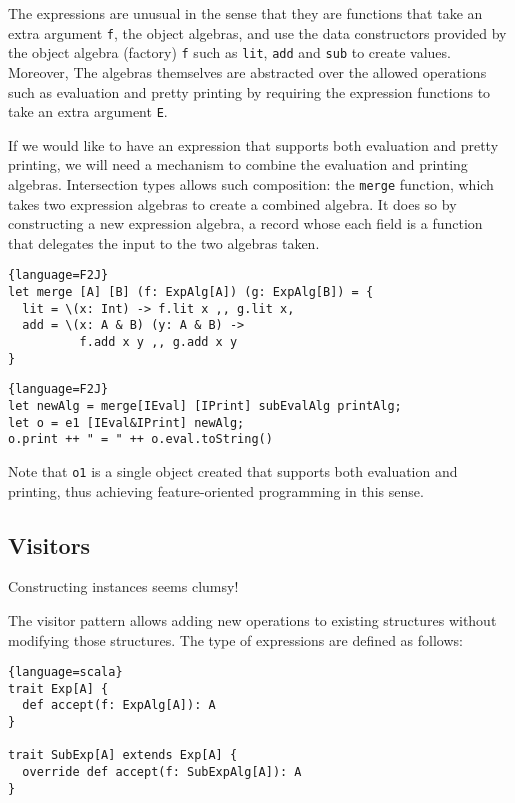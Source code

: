 The expressions are unusual in the sense that they are functions that take an
extra argument \lstinline$f$, the object algebras, and use the data constructors
provided by the object algebra (factory) \lstinline$f$ such as \lstinline$lit$,
\lstinline$add$ and \lstinline$sub$ to create values. Moreover, The algebras
themselves are abstracted over the allowed operations such as evaluation and
pretty printing by requiring the expression functions to take an extra argument
\lstinline$E$.

If we would like to have an expression that supports both evaluation and pretty
printing, we will need a mechanism to combine the evaluation and printing
algebras. Intersection types allows such composition: the \lstinline$merge$
function, which takes two expression algebras to create a combined algebra. It
does so by constructing a new expression algebra, a record whose each field is a
function that delegates the input to the two algebras taken.
\begin{lstlisting}{language=F2J}
let merge [A] [B] (f: ExpAlg[A]) (g: ExpAlg[B]) = {
  lit = \(x: Int) -> f.lit x ,, g.lit x,
  add = \(x: A & B) (y: A & B) ->
          f.add x y ,, g.add x y
}
\end{lstlisting}

\begin{lstlisting}{language=F2J}
let newAlg = merge[IEval] [IPrint] subEvalAlg printAlg;
let o = e1 [IEval&IPrint] newAlg;
o.print ++ " = " ++ o.eval.toString()
\end{lstlisting}
Note that \lstinline$o1$ is a single object created that supports both
evaluation and printing, thus achieving feature-oriented programming in this
sense.

\subsection{Visitors}

Constructing instances seems clumsy!

The visitor pattern allows adding new operations to existing structures without
modifying those structures. The type of expressions are defined as follows:

\begin{lstlisting}{language=scala}
trait Exp[A] {
  def accept(f: ExpAlg[A]): A
}

trait SubExp[A] extends Exp[A] {
  override def accept(f: SubExpAlg[A]): A
}
\end{lstlisting}

